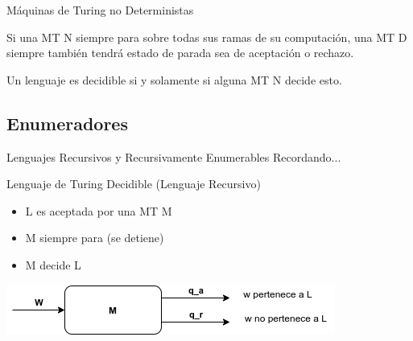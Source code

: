 \documentclass[11pt]{beamer}
\begin{document}
		\begin{frame}{Máquinas de Turing no Deterministas}
			\justifying
			\begin{theorem}
                Si una MT N siempre para sobre todas sus ramas de su computación, una MT D siempre también tendrá estado de parada sea de aceptación o rechazo.
            \end{theorem}
            \begin{corollary}
                Un lenguaje es decidible si y solamente si alguna MT N decide esto.
            \end{corollary}
		\end{frame}
		
		
	\subsection{Enumeradores}
	    \begin{frame}{Lenguajes Recursivos y Recursivamente Enumerables}
			\justifying
			Recordando...
            \begin{definition}
                Lenguaje de Turing Decidible (Lenguaje Recursivo)
                \begin{itemize}
                    \item L es aceptada por una MT M
                    \item M siempre para (se detiene)
                    \item M decide L
                \end{itemize}
            \end{definition}
    	    \begin{center}
	        \includegraphics[scale=0.5]{img/mtdecidible_lengrec.png}
    		\end{center}
		\end{frame}
		
\end{document}
